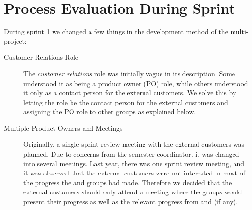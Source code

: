 \section{Process Evaluation During Sprint}\label{sec:s1_processeval}
During sprint 1 we changed a few things in the development method of the multi-project:

\begin{description}
  \item[Customer Relations Role] The \emph{customer relations} role was initially vague in its description. Some understood it as being a product owner (PO) role, while others understood it only as a contact person for the external customers. We solve this by letting the role be the contact person for the external customers and assigning the PO role to other groups as explained below.
  \item[Multiple Product Owners and Meetings] Originally, a single sprint review meeting with the external customers was planned. Due to concerns from the semester coordinator, it was changed into several meetings. Last year, there was one sprint review meeting, and it was observed that the external customers were not interested in most of the progress the \db and \bd groups had made. Therefore we decided that the external customers should only attend a meeting where the \gui groups would present their progress as well as the relevant progress from \db and \bd (if any).


\end{description}
